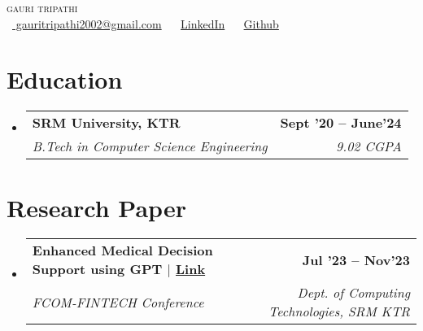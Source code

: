 \documentclass[letterpaper,11pt]{article}
\makeatletter
\newcommand{\resumeSubheading}[4]{
  \vspace{-2pt}\item
    \begin{tabular*}{1.0\textwidth}[t]{l@{\extracolsep{\fill}}r}
      \textbf{#1} & \textbf{\small #2} \\
      \textit{\small#3} & \textit{\small #4} \\
    \end{tabular*}\vspace{-7pt}
}
\newcommand{\resumeSubHeadingListStart}{\begin{itemize}[leftmargin=0.0in, label={}]}
\newcommand{\resumeSubHeadingListEnd}{\end{itemize}}
\makeatother
\begin{document}

\begin{center}
    {\Huge \scshape gauri tripathi} \\ \vspace{1pt}
    \vspace{5pt}
    \raisebox{-0.2\height}\faEnvelope\ \href{mailto:gauritripathi2002@gmail.com}{ gauritripathi2002@gmail.com} ~ 
    \raisebox{-0.2\height}\faLinkedin\ \href{https://www.linkedin.com/in/rohit-tiwari-907387204/}{LinkedIn} ~
    \raisebox{-0.2\height}\faGithub\ \href{https://github.com/gauritripathi2002}{Github} ~ 
    \vspace{-8pt}
\end{center}

\section{Education}
   \resumeSubHeadingListStart
    \resumeSubheading
      {SRM University, KTR }{Sept '20 -- June'24}
      {B.Tech in Computer Science Engineering}{9.02 CGPA}
  \resumeSubHeadingListEnd
\section{Research Paper}
   \resumeSubHeadingListStart
    \resumeSubheading
      {{Enhanced Medical Decision Support using GPT} $|$ \href{https://drive.google.com/file/d/1MSTAiBIsHr9tp5k_2X68YMkhixVj0kRI/view} {Link}}{Jul '23 -- Nov'23}
      {FCOM-FINTECH Conference}{Dept. of Computing Technologies, SRM KTR}
  \resumeSubHeadingListEnd
\end{document}
